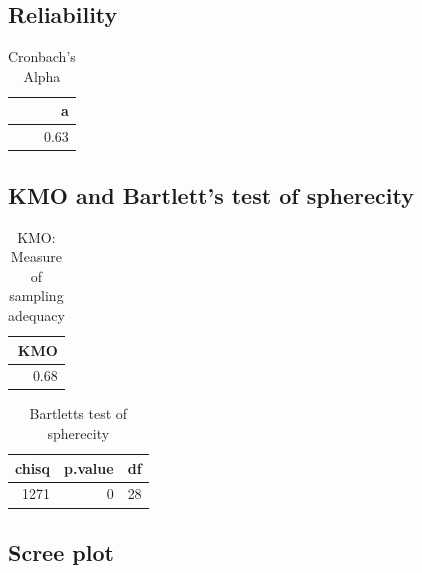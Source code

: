 \documentclass[]{article}
\begin{document}
\hypertarget{reliability-11}{%
\subsection{Reliability}\label{reliability-11}}

\begin{table}[H]

\caption{\label{tab:unnamed-chunk-63}Cronbach's Alpha}
\centering
\fontsize{6}{8}\selectfont
\begin{tabular}[t]{r}
\toprule
a\\
\midrule
0.63\\
\bottomrule
\end{tabular}
\end{table}

\hypertarget{kmo-and-bartletts-test-of-spherecity-12}{%
\subsection{KMO and Bartlett's test of
spherecity}\label{kmo-and-bartletts-test-of-spherecity-12}}

\begin{table}[H]

\caption{\label{tab:unnamed-chunk-64}KMO: Measure of sampling adequacy}
\centering
\fontsize{6}{8}\selectfont
\begin{tabular}[t]{r}
\toprule
KMO\\
\midrule
0.68\\
\bottomrule
\end{tabular}
\end{table}

\begin{table}[H]

\caption{\label{tab:unnamed-chunk-64}Bartletts test of spherecity}
\centering
\fontsize{6}{8}\selectfont
\begin{tabular}[t]{rrr}
\toprule
chisq & p.value & df\\
\midrule
1271 & 0 & 28\\
\bottomrule
\end{tabular}
\end{table}

\hypertarget{scree-plot-12}{%
\subsection{Scree plot}\label{scree-plot-12}}
\end{document}
